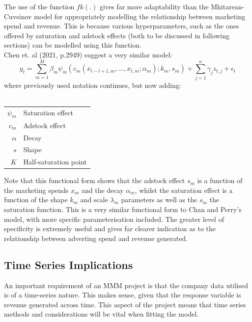 \documentclass[11pt, a4paper]{article}
\begin{document}
The use of the function $fk(.)$ gives far more adaptability than the Mhitarean-Cuvsinov model for appropriately modelling the relationship between marketing spend and revenue. This is because various hyperparameters, such as the ones offered by saturation and adstock effects (both to be discussed in following sections) can be modelled using this function.\\
Chen et. al (2021, p.2949) suggest a very similar model:\\
\begin{equation}
    y_{t}=\sum_{m=1}^{M}
    \beta_{m}\psi_{m}(c_{m}(x_{t-l+1,m},...,x_{t,m};\alpha_m);k_m,s_m) +\sum_{j=1}^n \gamma_{j}z_{t,j}+\epsilon_{t}
\end{equation}
where previously used notation continues, but now adding:\\\\
\hspace{1cm}
\begin{tabular}{r@{ : }l}
$\psi_{m}$ & Saturation effect\\
$c_{m}$ & Adstock effect\\
$\alpha$ & Decay\\
$s$ & Shape\\
$K$ & Half-saturation point\\
\end{tabular}


Note that this functional form shows that the adstock effect $s_{m}$ is a function of the marketing spends $x_{m}$ and the decay $\alpha_{m}$, whilst the saturation effect is a function of the shape $k_{m}$ and scale $\lambda_{m}$ parameters as well as the $s_{m}$ the saturation function. This is a very similar functional form to Chan and Perry's model, with more specific parameterisation included. The greater level of specificity is extremely useful and gives far clearer indication as to the relationship between adverting spend and revenue generated. 

\subsection{Time Series Implications}

An important requirement of an MMM project is that the company data utilised is of a time-series nature. This makes sense, given that the response variable is revenue generated across time. This aspect of the project means that time series methods and considerations will be vital when fitting the model.  
\end{document}
